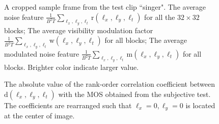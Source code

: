 \documentclass{sig-alternate}
\begin{document}
\begin{figure}[htp]
{\label{fig:m_feature}}
\caption{\label{fig:noise_visibility} A cropped sample frame from the test clip ``singer".  The average noise feature $\frac{1}{B^2T}\sum_{\ell_x,\ell_y,\ell_t}\mathrm{r}(\ell_x,\ell_y,\ell_t)$ for all the $32\times32$ blocks;
 The average visibility modulation factor $\frac{1}{B^2T}\sum_{\ell_x,\ell_y,\ell_t}\mathrm{w}(\ell_x,\ell_y,\ell_t)$ for all blocks;
 The average modulated noise feature $\frac{1}{B^2T}\sum_{\ell_x,\ell_y,\ell_t}\mathrm{m}(\ell_x,\ell_y,\ell_t)$ for all blocks. Brighter color indicate larger value.
} 
\end{figure}

\begin{figure}
\caption{\label{fig:correlation_map}The absolute value of the rank-order correlation coefficient between $\mathrm{d}(\ell_x,\ell_y,\ell_t)$ with the MOS obtained from the subjective test. The coefficients are rearranged such that $\ell_x=0,\ell_y=0$ is located at the center of image.}
\end{figure}
\end{document}
